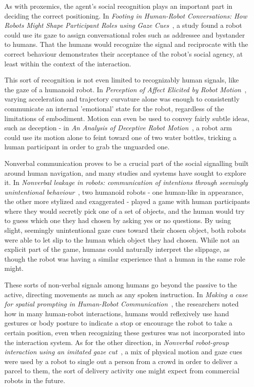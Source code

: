\documentclass{sfuthesis}
\begin{document}
As with proxemics, the agent's social recognition plays an important part in deciding the correct positioning. In \textit{Footing in Human-Robot Conversations: How Robots Might Shape Participant Roles using Gaze Cues}~\cite{mutlu2009footing}, a study found a robot could use its gaze to assign conversational roles such as addressee and bystander to humans. That the humans would recognize the signal and reciprocate with the correct behaviour demonstrates their acceptance of the robot's social agency, at least within the context of the interaction.

This sort of recognition is not even limited to recognizably human signals, like the gaze of a humanoid robot. In \textit{Perception of Affect Elicited by Robot Motion}~\cite{saerbeck2010perception}, varying acceleration and trajectory curvature alone was enough to consistently communicate an internal 'emotional' state for the robot, regardless of the limitations of embodiment. Motion can even be used to convey fairly subtle ideas, such as deception - in \textit{An Analysis of Deceptive Robot Motion}~\cite{dragan2014analysis}, a robot arm could use its motion alone to feint toward one of two water bottles, tricking a human participant in order to grab the unguarded one.

Nonverbal communication proves to be a crucial part of the social signalling built around human navigation, and many studies and systems have sought to explore it. In \textit{Nonverbal leakage in robots: communication of intentions through seemingly unintentional behaviour}~\cite{mutlu2009nonverbal}, two humanoid robots - one human-like in appearance, the other more stylized and exaggerated - played a game with human participants where they would secretly pick one of a set of objects, and the human would try to guess which one they had chosen by asking yes or no questions. By using slight, seemingly unintentional gaze cues toward their chosen object, both robots were able to let slip to the human which object they had chosen. While not an explicit part of the game, humans could naturally interpret the slippage, as though the robot was having a similar experience that a human in the same role might.

These sorts of non-verbal signals among humans go beyond the passive to the active, directing movements as much as any spoken instruction. In \textit{Making a case for spatial prompting in Human-Robot Communication}~\cite{green2006making}, the researchers noted how in many human-robot interactions, humans would reflexively use hand gestures or body posture to indicate a stop or encourage the robot to take a certain position, even when recognizing these gestures was not incorporated into the interaction system. As for the other direction, in \textit{Nonverbal robot-group interaction using an imitated gaze cut}~\cite{kirchner2011nonverbal}, a mix of physical motion and gaze cues were used by a robot to single out a person from a crowd in order to deliver a parcel to them, the sort of delivery activity one might expect from commercial robots in the future. 
\end{document}
